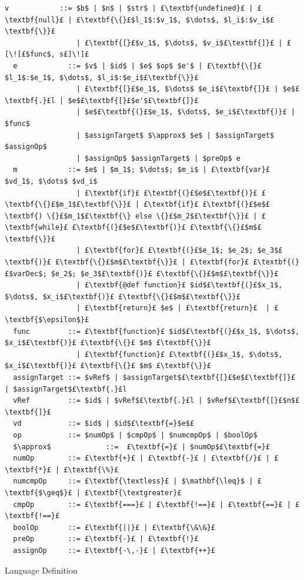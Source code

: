 \documentclass[12pt,a4paper,twoside,openright]{report}
\theoremstyle{definition}
\theoremstyle{dotless}
\begin{document}
\begin{listing}
\begin{lstlisting}[mathescape, escapechar=£]
  v            ::= $b$ | $n$ | $str$ | £\textbf{undefined}£ | £\textbf{null}£ | £\textbf{\{}£$l_1$:$v_1$, $\dots$, $l_i$:$v_i$£\textbf{\}}£
                 | £\textbf{[}£$v_1$, $\dots$, $v_i$£\textbf{]}£ | £[\![£$func$, s£]\!]£
  e            ::= $v$ | $id$ | $e$ $op$ $e'$ | £\textbf{\{}£$l_1$:$e_1$, $\dots$, $l_i$:$e_i$£\textbf{\}}£ 
                 | £\textbf{[}£$e_1$, $\dots$ $e_i$£\textbf{]}£ | $e$£\textbf{.}£l | $e$£\textbf{[}£$e'$£\textbf{]}£ 
                 | $e$£\textbf{(}£$e_1$, $\dots$, $e_i$£\textbf{)}£ | $func$
                 | $assignTarget$ $\approx$ $e$ | $assignTarget$ $assignOp$ 
                 | $assignOp$ $assignTarget$ | $preOp$ e
  m            ::= $e$ | $m_1$; $\dots$; $m_i$ | £\textbf{var}£ $vd_1$, $\dots$ $vd_i$ 
                 | £\textbf{if}£ £\textbf{(}£$e$£\textbf{)}£ £\textbf{\{}£$m_1$£\textbf{\}}£ | £\textbf{if}£ £\textbf{(}£$e$£\textbf{) \{}£$m_1$£\textbf{\} else \{}£$m_2$£\textbf{\}}£ | £\textbf{while}£ £\textbf{(}£$e$£\textbf{)}£ £\textbf{\{}£$m$£\textbf{\}}£ 
                 | £\textbf{for}£ £\textbf{(}£$e_1$; $e_2$; $e_3$£\textbf{)}£ £\textbf{\{}£$m$£\textbf{\}}£ | £\textbf{for}£ £\textbf{(}£$varDec$; $e_2$; $e_3$£\textbf{)}£ £\textbf{\{}£$m$£\textbf{\}}£ 
                 | £\textbf{@def function}£ $id$£\textbf{(}£$x_1$, $\dots$, $x_i$£\textbf{)}£ £\textbf{\{}£$m$£\textbf{\}}£
                 | £\textbf{return}£ $e$ | £\textbf{return}£  | £\textbf{$\epsilon$}£
  func         ::= £\textbf{function}£ $id$£\textbf{(}£$x_1$, $\dots$, $x_i$£\textbf{)}£ £\textbf{\{}£ $m$ £\textbf{\}}£ 
                 | £\textbf{function}£ £\textbf{(}£$x_1$, $\dots$, $x_i$£\textbf{)}£ £\textbf{\{}£ $m$ £\textbf{\}}£
  assignTarget ::= $vRef$ | $assignTarget$£\textbf{[}£$e$£\textbf{]}£ | $assignTarget$£\textbf{.}£l
  vRef         ::= $id$ | $vRef$£\textbf{.}£l | $vRef$£\textbf{[}£$n$£\textbf{]}£
  vd           ::= $id$ | $id$£\textbf{=}$e$£
  op           ::= $numOp$ | $cmpOp$ | $numcmpOp$ | $boolOp$
  $\approx$             ::=  £\textbf{=}£ | $numOp$£\textbf{=}£
  numOp        ::= £\textbf{+}£ | £\textbf{-}£ | £\textbf{/}£ | £\textbf{*}£ | £\textbf{\%}£
  numcmpOp     ::= £\textbf{\textless}£ | $\mathbf{\leq}$ | £\textbf{$\geq$}£ | £\textbf{\textgreater}£
  cmpOp        ::= £\textbf{===}£ | £\textbf{!==}£ | £\textbf{==}£ | £\textbf{!==}£
  boolOp       ::= £\textbf{||}£ | £\textbf{\&\&}£
  preOp        ::= £\textbf{-}£ | £\textbf{!}£
  assignOp     ::= £\textbf{-\,-}£ | £\textbf{++}£
\end{lstlisting}
\caption{Language Definition}
\label{lst:langdef}
\end{listing}
\end{document}
